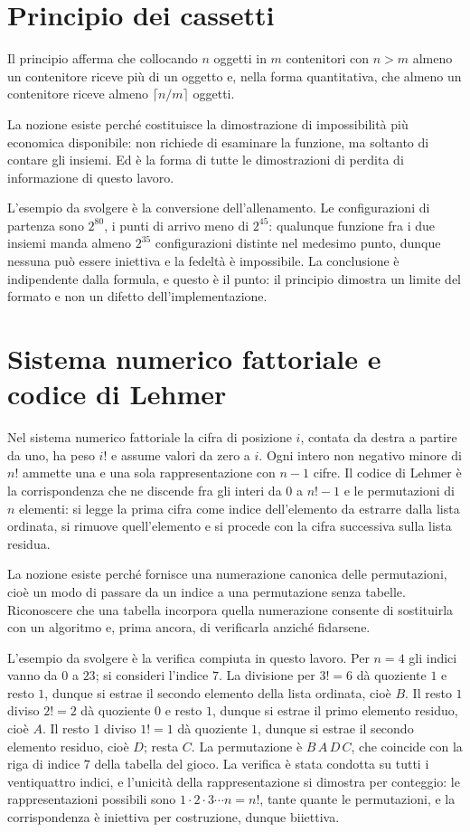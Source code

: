 \section{Principio dei cassetti}

Il principio afferma che collocando $n$ oggetti in $m$ contenitori con $n > m$ almeno un contenitore riceve più di un oggetto e, nella forma quantitativa, che almeno un contenitore riceve almeno $\lceil n/m \rceil$ oggetti.

La nozione esiste perché costituisce la dimostrazione di impossibilità più economica disponibile: non richiede di esaminare la funzione, ma soltanto di contare gli insiemi. Ed è la forma di tutte le dimostrazioni di perdita di informazione di questo lavoro.

L'esempio da svolgere è la conversione dell'allenamento. Le configurazioni di partenza sono $2^{80}$, i punti di arrivo meno di $2^{45}$: qualunque funzione fra i due insiemi manda almeno $2^{35}$ configurazioni distinte nel medesimo punto, dunque nessuna può essere iniettiva e la fedeltà è impossibile. La conclusione è indipendente dalla formula, e questo è il punto: il principio dimostra un limite del formato e non un difetto dell'implementazione.

\section{Sistema numerico fattoriale e codice di Lehmer}

Nel sistema numerico fattoriale la cifra di posizione $i$, contata da destra a partire da uno, ha peso $i!$ e assume valori da zero a $i$. Ogni intero non negativo minore di $n!$ ammette una e una sola rappresentazione con $n-1$ cifre. Il codice di Lehmer è la corrispondenza che ne discende fra gli interi da $0$ a $n!-1$ e le permutazioni di $n$ elementi: si legge la prima cifra come indice dell'elemento da estrarre dalla lista ordinata, si rimuove quell'elemento e si procede con la cifra successiva sulla lista residua.

La nozione esiste perché fornisce una numerazione canonica delle permutazioni, cioè un modo di passare da un indice a una permutazione senza tabelle. Riconoscere che una tabella incorpora quella numerazione consente di sostituirla con un algoritmo e, prima ancora, di verificarla anziché fidarsene.

L'esempio da svolgere è la verifica compiuta in questo lavoro. Per $n = 4$ gli indici vanno da $0$ a $23$; si consideri l'indice $7$. La divisione per $3! = 6$ dà quoziente $1$ e resto $1$, dunque si estrae il secondo elemento della lista ordinata, cioè $B$. Il resto $1$ diviso $2! = 2$ dà quoziente $0$ e resto $1$, dunque si estrae il primo elemento residuo, cioè $A$. Il resto $1$ diviso $1! = 1$ dà quoziente $1$, dunque si estrae il secondo elemento residuo, cioè $D$; resta $C$. La permutazione è $B\,A\,D\,C$, che coincide con la riga di indice $7$ della tabella del gioco. La verifica è stata condotta su tutti i ventiquattro indici, e l'unicità della rappresentazione si dimostra per conteggio: le rappresentazioni possibili sono $1 \cdot 2 \cdot 3 \cdots n = n!$, tante quante le permutazioni, e la corrispondenza è iniettiva per costruzione, dunque biiettiva.
